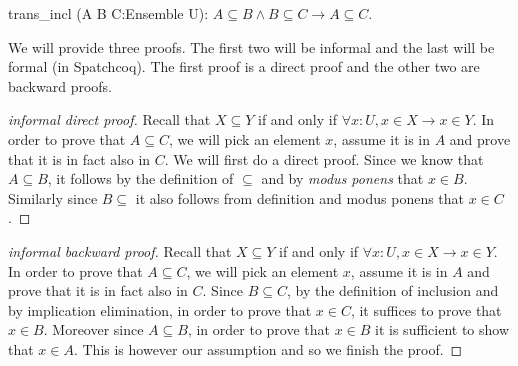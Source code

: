 \begin{lemma}
trans\_incl (A B C:Ensemble U): $A\subseteq B \land B \subseteq C \rightarrow A \subseteq C$.
\end{lemma}

We will provide three proofs. The first two will be informal and the last will be formal (in Spatchcoq). The first proof is a direct proof and the other two are backward proofs.
\begin{proof}[informal direct proof]

Recall that $X\subseteq Y$ if and only if $\forall x:U, x \in X \rightarrow x \in Y$.
 In order to prove that $ A\subseteq C$, we will pick an element $x$, assume it is in $A$ and prove that it is in fact also in $C$. We will first do a direct proof. Since we know that $A\subseteq B$,  it follows by the definition of $\subseteq$ and by {\it modus ponens} that $x \in B$. Similarly since $B\subseteq$ it also follows from definition and modus ponens that $x\in C$.
\end{proof}
\begin{proof}[informal backward  proof]

Recall that $X\subseteq Y$ if and only if $\forall x:U, x \in X \rightarrow x \in Y$.
 In order to prove that $ A\subseteq C$, we will pick an element $x$, assume it is in $A$ and prove that it is in fact also in $C$. 
Since $B \subseteq C$, by the definition of inclusion and by implication elimination, in order to prove that $x \in C$, it suffices to prove that $x \in B$. Moreover since $A\subseteq B$, in order to prove that $x \in B$ it is sufficient to show that $x \in A$. This is however our assumption and so we finish the proof.
\end{proof}

